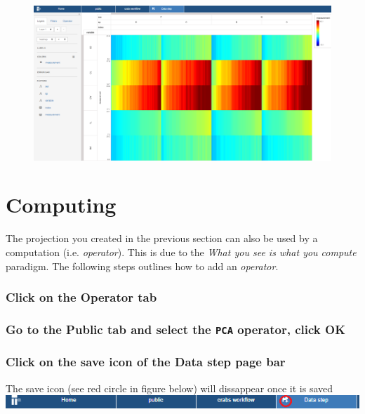 \documentclass[]{book}
\theoremstyle{definition}
\theoremstyle{definition}
\theoremstyle{remark}
\begin{document}
\begin{figure}[htbp]
\centering
\includegraphics{images/projection_heatmap_crabs.png}
\caption{}
\end{figure}

\section{Computing}\label{computing}

The projection you created in the previous section can also be used by a
computation (i.e. \emph{operator}). This is due to the \emph{What you
see is what you compute} paradigm. The following steps outlines how to
add an \emph{operator}.

\subsubsection{\texorpdfstring{Click on the \textbf{Operator}
tab}{Click on the Operator tab}}\label{click-on-the-operator-tab}

\subsubsection{\texorpdfstring{Go to the \textbf{Public tab} and select
the \texttt{PCA} operator, click
\textbf{OK}}{Go to the Public tab and select the PCA operator, click OK}}\label{go-to-the-public-tab-and-select-the-pca-operator-click-ok}

\subsubsection{Click on the save icon of the Data step page
bar}\label{click-on-the-save-icon-of-the-data-step-page-bar}

The save icon (see red circle in figure below) will dissappear once it
is saved \includegraphics{images/save_data_step.png}
\end{document}
